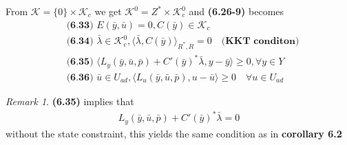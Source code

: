 \documentclass[a4paper,11pt,fleqn]{book}
\theoremstyle{definition}
\theoremstyle{remark}
\newtheorem*{remark}{Remark}
\begin{document}
From $\mathcal{K} = \{0\} \times \mathcal{K}_c$ we get $\mathcal{K}^0 = Z^* \times \mathcal{K}_c^0$ and \textbf{(6.26-9)} becomes
\begin{align*}
	&\textbf{(6.33) }E(\bar{y}, \bar{u}) = 0, C(\bar{y}) \in \mathcal{K}_c\\
	&\textbf{(6.34) }\bar{\lambda} \in \mathcal{K}_c^0, \langle \bar{\lambda}, C(\bar{y}) \rangle_{R^*, R} = 0 \quad \textbf{(KKT conditon)} \\
	&\textbf{(6.35) }\langle L_y(\bar{y}, \bar{u}, \bar{p}) + C'(\bar{y})^* \bar{\lambda}, y - \bar{y} \rangle \geq 0, \forall y \in Y\\
	&\textbf{(6.36) }\bar{u} \in U_{ad}, \langle L_u(\bar{y}, \bar{u}, \bar{p}), u - \bar{u} \rangle \geq 0 \quad \forall u \in U_{ad}
\end{align*}
\begin{remark}
\textbf{(6.35)} implies that 
\begin{align*}
	L_y(\bar{y}, \bar{u}, \bar{p}) + C'(\bar{y})^* \bar{\lambda} = 0
\end{align*}	
without the state constraint, this yields the same condition as in  \textbf{corollary 6.2}
\end{remark}
\end{document}
